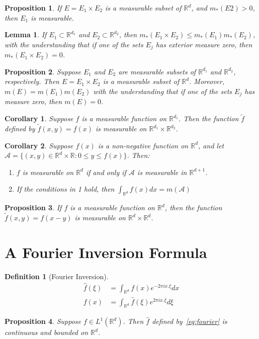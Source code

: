 \documentclass{report}
\theoremstyle{upthm}
\newtheorem{defn}{Definition}
\newtheorem{lemma}{Lemma}
\newtheorem{cor}{Corollary}
\newtheorem{prop}{Proposition}
\newcommand{\reals}{\mathbb{R}}
\newcommand{\calA}{{\mathcal{A}}}
\newcommand{\set}[1]{\big\lbrace #1 \big\rbrace}
\begin{document}
\begin{prop}
	If $E = E_1 \times E_2$ is a measurable subset of $\reals^d$, and $m_*(E2) > 0$, then $E_1$ is measurable.
\end{prop}

\begin{lemma}
	If $E_1 \subset \reals^{d_1}$ and $E_2 \subset \reals^{d_2}$, then $m_*(E_1 \times E_2) \leq m_*(E_1)m_*(E_2)$, with the understanding that if one of the sets $E_j$ has exterior measure zero, then $m_*(E_1 \times E_2) = 0$.
\end{lemma}

\begin{prop}
	Suppose $E_1$ and $E_2$ are measurable subsets of $\reals^{d_1}$ and $\reals^{d_2}$, respectively. Then $E = E_1 \times E_2$ is a measurable subset of $\reals^d$. Moreover, $m(E) = m(E_1)m(E_2)$ with the understanding that if one of the sets $E_j$ has measure zero, then $m(E) = 0$.
\end{prop}

\begin{cor}
	Suppose $f$ is a measurable function on $\reals^{d_1}$. Then the function $\tilde{f}$ defined by $\tilde{f}(x, y) = f(x)$ is measurable on $\reals^{d_1} \times \reals^{d_2}$.
\end{cor}

\begin{cor}
	Suppose $f(x)$ is a non-negative function on $\reals^d$, and let $\calA = \set{(x, y) \in \reals^d \times \reals : 0 \leq y \leq f(x)}$. Then:
	\begin{enumerate}
		\item $f$ is measurable on $\reals^d$ if and only if $\calA$ is measurable in $\reals^{d + 1}$.
		\item If the conditions in 1 hold, then $\int_{\reals^d} f(x) dx = m(\calA)$
	\end{enumerate}
\end{cor}

\begin{prop}
	If $f$ is a measurable function on $\reals^d$, then the function $\tilde{f}(x, y) = f(x - y)$ is measurable on $\reals^d \times \reals^d$.
\end{prop}

\section{A Fourier Inversion Formula}

\begin{defn}[Fourier Inversion]
	\begin{align}
	\label{eq:fourier}
	\hat{f}(\xi) &= \int_{\reals^d} f(x) e^{-2 \pi i x . \xi} dx\\
	f(x) &= \int_{\reals^d} \hat{f}(\xi) e^{2 \pi i x . \xi} d\xi  
	\end{align}
\end{defn}
\begin{prop}
	Suppose $f \in L^1(\reals^d)$. Then $\hat{f}$ defined by~\eqref{eq:fourier} is continuous and bounded on $\reals^d$.
\end{prop}
\end{document}
